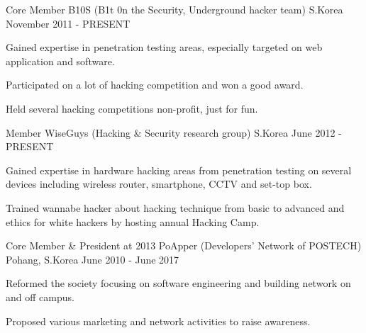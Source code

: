 

\begin{cventries}

  \cventry
    {Core Member} %
    {B10S (B1t 0n the Security, Underground hacker team)} %
    {S.Korea} %
    {November 2011 - PRESENT} %
    {
      \begin{cvitems} %
        \item {Gained expertise in penetration testing areas, especially targeted on web application and software.}
        \item {Participated on a lot of hacking competition and won a good award.}
        \item {Held several hacking competitions non-profit, just for fun.}
      \end{cvitems}
    }

  \cventry
    {Member} %
    {WiseGuys (Hacking \& Security research group)} %
    {S.Korea} %
    {June 2012 - PRESENT} %
    {
      \begin{cvitems} %
        \item {Gained expertise in hardware hacking areas from penetration testing on several devices including wireless router, smartphone, CCTV and set-top box.}
        \item {Trained wannabe hacker about hacking technique from basic to advanced and ethics for white hackers by hosting annual Hacking Camp.}
      \end{cvitems}
    }

  \cventry
    {Core Member \& President at 2013} %
    {PoApper (Developers' Network of POSTECH)} %
    {Pohang, S.Korea} %
    {June 2010 - June 2017} %
    {
      \begin{cvitems} %
        \item {Reformed the society focusing on software engineering and building network on and off campus.}
        \item {Proposed various marketing and network activities to raise awareness.}
      \end{cvitems}
    }


\end{cventries}
